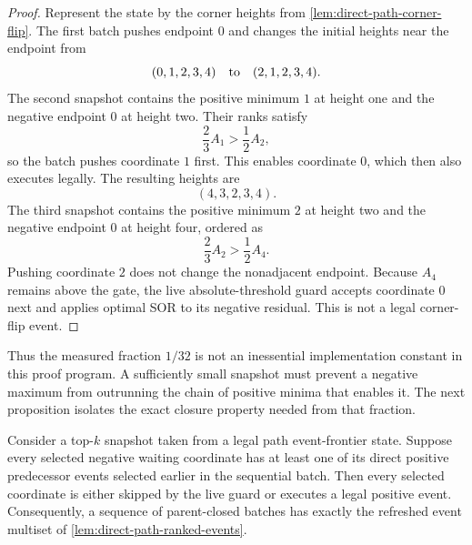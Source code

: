 \begin{proof}
Represent the state by the corner heights from
\cref{lem:direct-path-corner-flip}.  The first batch pushes endpoint $0$ and
changes the initial heights near the endpoint from
\begin{equation*}
 (0,1,2,3,4)\quad\hbox{to}\quad(2,1,2,3,4).
\end{equation*}
The second snapshot contains the positive minimum $1$ at height one and the
negative endpoint $0$ at height two.  Their ranks satisfy
\begin{equation*}
 \frac23A_1>\frac12A_2,
\end{equation*}
so the batch pushes coordinate $1$ first.  This enables coordinate $0$,
which then also executes legally.  The resulting heights are
\begin{equation*}
 (4,3,2,3,4).
\end{equation*}
The third snapshot contains the positive minimum $2$ at height two and the
negative endpoint $0$ at height four, ordered as
\begin{equation*}
 \frac23A_2>\frac12A_4.
\end{equation*}
Pushing coordinate $2$ does not change the nonadjacent endpoint.  Because
$A_4$ remains above the gate, the live absolute-threshold guard accepts
coordinate $0$ next and applies optimal SOR to its negative residual.  This
is not a legal corner-flip event.
\end{proof}

Thus the measured fraction $1/32$ is not an inessential implementation
constant in this proof program.  A sufficiently small snapshot must prevent
a negative maximum from outrunning the chain of positive minima that enables
it.  The next proposition isolates the exact closure property needed from
that fraction.

\begin{proposition}
\label{prop:direct-path-parent-closed-batch}
Consider a top-$k$ snapshot taken from a legal path event-frontier state.
Suppose every selected negative waiting coordinate has at least one of its
direct positive predecessor events selected earlier in the sequential batch.
Then every selected coordinate is either skipped by the live guard or
executes a legal positive event. Consequently, a sequence of parent-closed
batches has exactly the refreshed event multiset of
\cref{lem:direct-path-ranked-events}.
\end{proposition}

